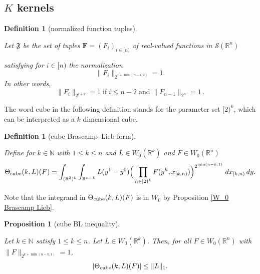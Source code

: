 \documentclass[12pt,reqno]{amsart}
\theoremstyle{plain}
\newtheorem{proposition}[theorem]{Proposition}
\newtheorem{definition}[theorem]{Definition}
\numberwithin{equation}{section}
\theoremstyle{remark}
\newcommand{\uses}[1]{}
\newcommand{\usesdefs}[1]{}
\newcommand{\leanok}{}
\newcommand{\lean}[1]{}
\newcommand{\R}{{\mathbb R}}
\newcommand{\N}{{\mathbb N}}
\newcommand{\F}{\mathbf{F}}
\begin{document}
\subsection{\texorpdfstring{$K$ kernels}{K kernels}}


\begin{definition}[normalized function tuples]\label{normalized function tuples}\uses{}\usesdefs{}
\lean{Auto.normalizedFunctionTuples}
 Let $\mathfrak{F}$ be the set of tuples
$\F=(F_i)_{i\in [n)}$ of real-valued functions in $\mathcal{S}(\R^n)$


satisfying for $i\in [n)$ the normalization
 \begin{equation}\label{auto:normalized-function-tuple} \|F_{i}\|_{2^{i+\min(n-i,2)}}=1. \end{equation}
In other words,
 \begin{equation}\label{f-normalization}
  \|F_{i}\|_{2^{i+2}}=1\;\text{if}\;i\le n-2\;\text{and}\;\|F_{n-1}\|_{2^{n}}=1  \, .
 \end{equation}

\end{definition}


The word cube in the following definition stands for the parameter set $[2)^k$, which can be interpreted as a $k$ dimensional cube.

\begin{definition}[cube Brascamp--Lieb form]\label{cube Brascamp--Lieb}\uses{W_0 Brascamp Lieb}\usesdefs{auto:Wiener-space-definition}
\lean{Auto.cubeBrascampLiebForm}
Define for $k\in\N$ with $1 \le k\le  n$
and  $L\in W_0(\R^k)$ and $F\in W_0(\R^n)$
\begin{equation}\label{auto:cube-Brascamp-Lieb-form} \Theta_{{\rm cube}}(k,L)(F) = \int_{(\R^2)^k} \int_{\R^{n-k}} L(y^1-y^0) \Big(\prod_{h\in [2)^k} F(y^h, x_{[k,n)})\Big)^{2^{\min(n-k,1)}}\;dx_{[k,n)}\,dy.\end{equation}
\end{definition}
Note that the integrand in $\Theta_{{\rm cube}}(k, L)(F)$ is in $W_0$ by Proposition \ref{W_0 Brascamp Lieb}.


\begin{proposition}[cube BL inequality]\label{cube BL inequality}\uses{}\usesdefs{auto:Wiener-space-definition,cube Brascamp--Lieb}
\lean{Auto.cubeBLInequality}
\leanok
Let $k\in\N$ satisfy $1 \le k\le n$.  Let $L\in W_0(\R^k)$. Then, for all $F\in W_0(\R^n)$ with $\|F\|_{2^{k+\min(n-k,1)}}=1$,
\begin{equation}\label{cube-k-m-bound}
   |\Theta_{\rm cube}(k,L)(F)| \le\|L\|_1 .
\end{equation}
\end{proposition}
\end{document}
